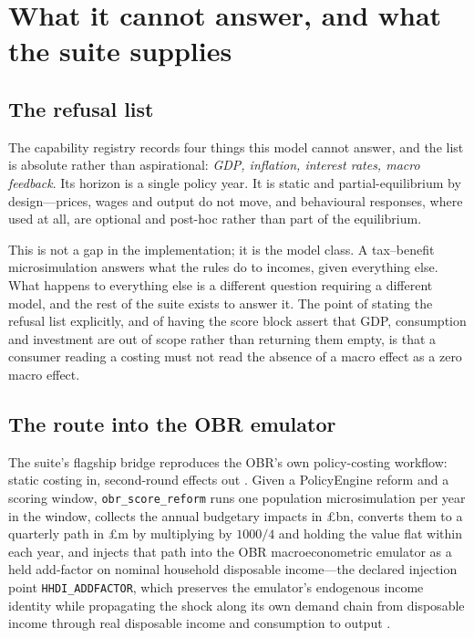 \section{What it cannot answer, and what the suite supplies}
\label{sec:bridge}

\subsection{The refusal list}

The capability registry records four things this model cannot answer, and the list is absolute rather than aspirational: \emph{GDP, inflation, interest rates, macro feedback}. Its horizon is a single policy year. It is static and partial-equilibrium by design---prices, wages and output do not move, and behavioural responses, where used at all, are optional and post-hoc rather than part of the equilibrium.

This is not a gap in the implementation; it is the model class. A tax--benefit microsimulation answers what the rules do to incomes, given everything else. What happens to everything else is a different question requiring a different model, and the rest of the suite exists to answer it. The point of stating the refusal list explicitly, and of having the score block assert that GDP, consumption and investment are out of scope rather than returning them empty, is that a consumer reading a costing must not read the absence of a macro effect as a zero macro effect.

\subsection{The route into the OBR emulator}
\label{sec:obrbridge}

The suite's flagship bridge reproduces the OBR's own policy-costing workflow: static costing in, second-round effects out \citep{obr2014costings}. Given a PolicyEngine reform and a scoring window, \texttt{obr\_score\_reform} runs one population microsimulation per year in the window, collects the annual budgetary impacts in \pounds bn, converts them to a quarterly path in \pounds m by multiplying by $1000/4$ and holding the value flat within each year, and injects that path into the OBR macroeconometric emulator as a held add-factor on nominal household disposable income---the declared injection point \texttt{HHDI\_ADDFACTOR}, which preserves the emulator's endogenous income identity while propagating the shock along its own demand chain from disposable income through real disposable income and consumption to output \citep{ahmadi2026obr}.

